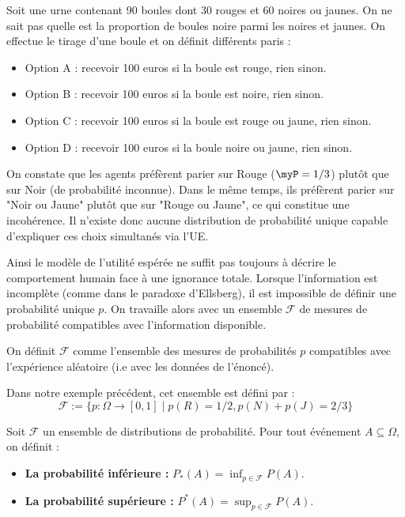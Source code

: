 \begin{proposition}
    Soit une urne contenant 90 boules dont 30 rouges et 60 noires ou jaunes. 
    On ne sait pas quelle est la proportion de boules noire parmi les noires et jaunes. 
    On effectue le tirage d'une boule et on définit différents paris : 
    \begin{itemize}
        \item Option A : recevoir 100 euros si la boule est rouge, rien sinon.
        \item Option B : recevoir 100 euros si la boule est noire, rien sinon. 
        \item Option C : recevoir 100 euros si la boule est rouge ou jaune, rien sinon. 
        \item Option D : recevoir 100 euros si la boule noire ou jaune, rien sinon. 
    \end{itemize}
    On constate que les agents préfèrent parier sur Rouge ($ \myP = 1/3$) plutôt que sur Noir (de probabilité inconnue). 
    Dans le même temps, ils préfèrent parier sur "Noir ou Jaune" plutôt que sur "Rouge ou Jaune", ce qui constitue 
    une incohérence. 
    Il n'existe donc aucune distribution de probabilité unique capable d'expliquer ces choix simultanés via l'UE.
\end{proposition}

Ainsi le modèle de l'utilité espérée ne suffit pas toujours à décrire le comportement humain face à une ignorance 
totale. 
Lorsque l'information est incomplète (comme dans le paradoxe d'Ellsberg), il est impossible de définir une probabilité 
unique $p$. On travaille alors avec un ensemble $\mathcal{F}$ de mesures de probabilité compatibles avec 
l'information disponible.

\begin{definition}
    On définit $ \mathcal{F}$ comme l'ensemble des mesures de probabilités $p$ compatibles 
    avec l'expérience aléatoire (i.e avec les données de l'énoncé). 
\end{definition}

\begin{example}
    Dans notre exemple précédent, cet ensemble est défini par : 
        $$ \mathcal{F} := \{p : \Omega \longrightarrow [0,1] \mid p(R) = 1/2, p(N) + p(J) = 2/3\} $$
\end{example}

\begin{definition}
    Soit $\mathcal{F}$ un ensemble de distributions de probabilité. 
    Pour tout événement $A \subseteq \Omega$, on définit :
    \begin{itemize}
        \item \textbf{La probabilité inférieure :} $P_*(A) = \inf_{p \in \mathcal{F}} P(A)$.
        \item \textbf{La probabilité supérieure :} $P^*(A) = \sup_{p \in \mathcal{F}} P(A)$.
    \end{itemize}
\end{definition}

